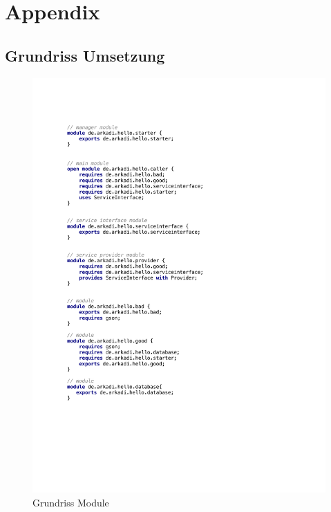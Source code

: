 \chapter{Appendix}
\label{appendixA}
\section{Grundriss Umsetzung}

   \begin{figure}[]
      \centering
      \includegraphics[]{material/images/appendix/modules.pdf}
      \caption{Grundriss Module}
      \label{fig:modulesG}
    \end{figure}


